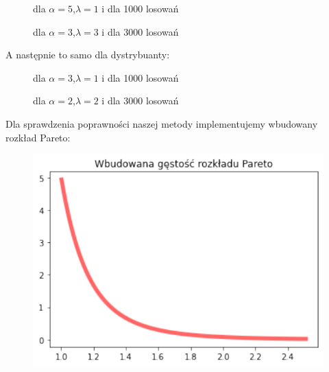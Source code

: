 \documentclass{article}
\begin{document}
\begin{enumerate}
\begin{figure}[h]
\begin{center}
{				}
				\caption{dla $\alpha = 5$,$\lambda = 1$ i dla 1000 losowań}
				\caption{dla $\alpha = 3$,$\lambda = 3$ i dla 3000 losowań}
			\end{center}
		\end{figure}
	
		A następnie to samo dla dystrybuanty:
		\begin{figure}[h]
			\begin{center}
				\caption{dla $\alpha = 3$,$\lambda = 1$ i dla 1000 losowań}
				\caption{dla $\alpha = 2$,$\lambda = 2$ i dla 3000 losowań}
			\end{center}
		\end{figure}
	
		Dla sprawdzenia poprawności naszej metody implementujemy wbudowany rozkład Pareto:
		
		\begin{figure}[h]
			\centering
			\includegraphics{obrazek5.pdf}
		\end{figure}
	

\end{enumerate}
\end{document}

